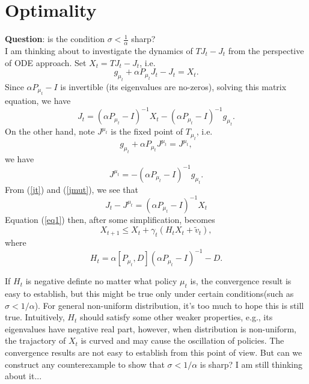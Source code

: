 \documentclass[12pt,a4paper]{amsart}
\numberwithin{equation}{section}
\theoremstyle{plain}
\theoremstyle{definition}
\begin{document}
\section{Optimality}
\textbf{Question}: is the condition $\sigma < \frac{1}{\alpha}$ sharp? \\

I am thinking about to investigate the dynamics of $TJ_t - J_t$ from the perspective of ODE approach.   Set $X_t = TJ_t - J_t$, i.e. 
$$
g_{\mu_t} + \alpha P_{\mu_t} J_t  - J_t= X_t.
$$
Since $\alpha P_{\mu_t} - I$ is invertible (its eigenvalues are no-zeros),  solving this matrix equation, we have 
\begin{equation}\label{jt}
J_t = (\alpha P_{\mu_t} - I)^{-1}X_t - (\alpha P_{\mu_t} - I)^{-1} g_{\mu_t}.
\end{equation}
On the other hand, note $J^{\mu_t}$ is the fixed point of $T_{\mu_t}$, i.e.
$$
g_{\mu_t} + \alpha P_{\mu_t} J^{\mu_t} = J^{\mu_t},
$$
we have 
\begin{equation}\label{jmut}
J^{\mu_t} = -(\alpha P_{\mu_t} - I)^{-1} g_{\mu_t}.
\end{equation}
From (\ref{jt}) and (\ref{jmut}), we see that
$$
J_t - J^{\mu_t} =  (\alpha P_{\mu_t} - I)^{-1}X_t
$$
Equation (\ref{eq1}) then, after some simplification, becomes
\begin{equation}
	X_{t+1} \le X_t + \gamma_t (H_t X_t +  \tilde{v}_t), 
\end{equation}
where 
$$
H_t = \alpha [ P_{\mu_t}, D](\alpha P_{\mu_t} - I)^{-1} - D. 
$$

If $H_t$ is negative definte no matter what policy $\mu_t$ is, the convergence result is easy to establish, but this might be true only under certain conditions(such as $\sigma < 1/\alpha$). For general non-uniform distribution, it's too much to hope this is still true.  Intuitively, $H_t$ should satisfy some other weaker properties, e.g., its eigenvalues have negative real part, however, when distribution is non-uniform, the trajactory of $X_t$ is curved and may cause the oscillation of policies. The convergence results are not easy to establish from this point of view.  But can we construct any counterexample to show that $\sigma < 1/\alpha$ is sharp? I am still thinking about it...





\appendix
\raggedbottom
\sloppy
\end{document}
